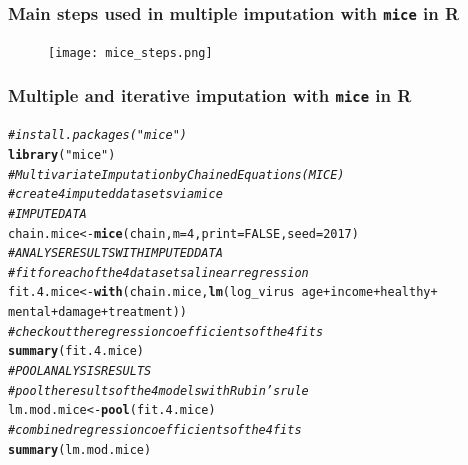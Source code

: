 \documentclass{beamer}\usepackage[]{graphicx}\usepackage[]{color}
\makeatletter
\newcommand{\hlnum}[1]{\textcolor[rgb]{0.686,0.059,0.569}{#1}}%
\newcommand{\hlstr}[1]{\textcolor[rgb]{0.192,0.494,0.8}{#1}}%
\newcommand{\hlcom}[1]{\textcolor[rgb]{0.678,0.584,0.686}{\textit{#1}}}%
\newcommand{\hlopt}[1]{\textcolor[rgb]{0,0,0}{#1}}%
\newcommand{\hlstd}[1]{\textcolor[rgb]{0.345,0.345,0.345}{#1}}%
\newcommand{\hlkwb}[1]{\textcolor[rgb]{0.69,0.353,0.396}{#1}}%
\newcommand{\hlkwc}[1]{\textcolor[rgb]{0.333,0.667,0.333}{#1}}%
\newcommand{\hlkwd}[1]{\textcolor[rgb]{0.737,0.353,0.396}{\textbf{#1}}}%
\newenvironment{kframe}{%
 \def\at@end@of@kframe{}%
 \ifinner\ifhmode%
  \def\at@end@of@kframe{\end{minipage}}%
  \begin{minipage}{\columnwidth}%
 \fi\fi%
 \def\FrameCommand##1{\hskip\@totalleftmargin \hskip-\fboxsep
 \colorbox{shadecolor}{##1}\hskip-\fboxsep
     \hskip-\linewidth \hskip-\@totalleftmargin \hskip\columnwidth}%
 \MakeFramed {\advance\hsize-\width
   \@totalleftmargin\z@ \linewidth\hsize
   \@setminipage}}%
 {\par\unskip\endMakeFramed%
 \at@end@of@kframe}
\newenvironment{knitrout}{}{} %
\makeatother
\begin{document}
{{{
\begin{frame}
\frametitle{Main steps used in multiple imputation with \texttt{mice} in R}
\begin{figure}
\texttt{[image: mice\_steps.png]}
\end{figure}
\end{frame}

\begin{frame}[fragile]
\frametitle{Multiple and iterative imputation with \texttt{mice} in R}
\begin{knitrout}\tiny
{}\color{fgcolor}\begin{kframe}
\begin{alltt}
\hlcom{# install.packages("mice")}
\hlkwd{library}\hlstd{(}\hlstr{"mice"}\hlstd{)}
\hlcom{# Multivariate Imputation by Chained Equations (MICE)}
\hlcom{# create 4 imputed data sets via mice}
\hlcom{# IMPUTE DATA}
\hlstd{chain.mice} \hlkwb{<-} \hlkwd{mice}\hlstd{(chain,} \hlkwc{m} \hlstd{=} \hlnum{4}\hlstd{,} \hlkwc{print} \hlstd{=} \hlnum{FALSE}\hlstd{,} \hlkwc{seed} \hlstd{=} \hlnum{2017}\hlstd{)}
\hlcom{# ANALYSE RESULTS WITH IMPUTED DATA}
\hlcom{# fit for each of the 4 data sets a linear regression}
\hlstd{fit.4.mice} \hlkwb{<-} \hlkwd{with}\hlstd{(chain.mice,} \hlkwd{lm}\hlstd{(log_virus} \hlopt{~} \hlstd{age} \hlopt{+} \hlstd{income} \hlopt{+} \hlstd{healthy} \hlopt{+}
                                     \hlstd{mental} \hlopt{+} \hlstd{damage} \hlopt{+} \hlstd{treatment))}
\hlcom{# check out the regression coefficients of the 4 fits}
\hlkwd{summary}\hlstd{(fit.4.mice)}
\hlcom{# POOL ANALYSIS RESULTS}
\hlcom{# pool the results of the 4 models with Rubin's rule}
\hlstd{lm.mod.mice} \hlkwb{<-} \hlkwd{pool}\hlstd{(fit.4.mice)}
\hlcom{# combined regression coefficients of the 4 fits}
\hlkwd{summary}\hlstd{(lm.mod.mice)}
\end{alltt}
\end{kframe}
\end{knitrout}

\end{frame}

}}}
\end{document}

